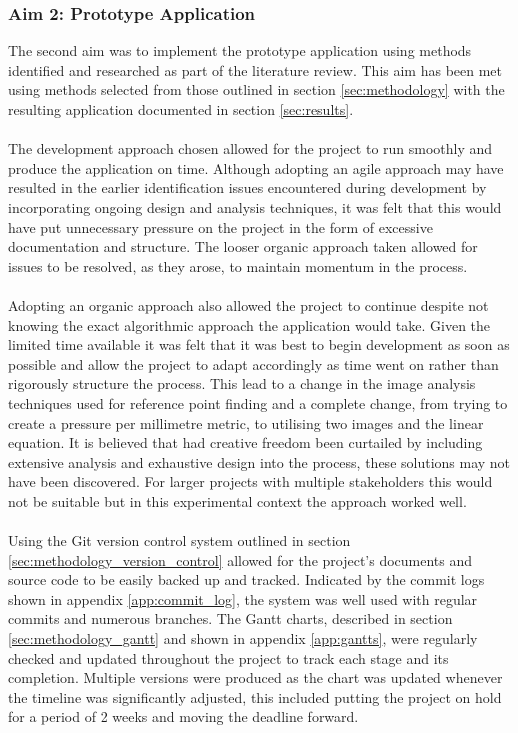 		\subsubsection{Aim 2: Prototype Application}
			The second aim was to implement the prototype application using methods identified and researched as part of the literature review. This aim has been met using methods selected from those outlined in section \ref{sec:methodology} with the resulting application documented in section \ref{sec:results}.
			\\\\
			The development approach chosen allowed for the project to run smoothly and produce the application on time. Although adopting an agile approach may have resulted in the earlier identification issues encountered during development by incorporating ongoing design and analysis techniques, it was felt that this would have put unnecessary pressure on the project in the form of excessive documentation and structure. The looser organic approach taken allowed for issues to be resolved, as they arose, to maintain momentum in the process. 
			\\\\
			Adopting an organic approach also allowed the project to continue despite not knowing the exact algorithmic approach the application would take. Given the limited time available it was felt that it was best to begin development as soon as possible and allow the project to adapt accordingly as time went on rather than rigorously structure the process. This lead to a change in the image analysis techniques used for reference point finding and a complete change, from trying to create a pressure per millimetre metric, to utilising two images and the linear equation. It is believed that had creative freedom been curtailed by including extensive analysis and exhaustive design into the process, these solutions may not have been discovered. For larger projects with multiple stakeholders this would not be suitable but in this experimental context the approach worked well.
			\\\\
			Using the Git version control system outlined in section \ref{sec:methodology_version_control} allowed for the project's documents and source code to be easily backed up and tracked. Indicated by the commit logs shown in appendix \ref{app:commit_log}, the system was well used with regular commits and numerous branches. The Gantt charts, described in section \ref{sec:methodology_gantt} and shown in appendix \ref{app:gantts}, were regularly checked and updated throughout the project to track each stage and its completion. Multiple versions were produced as the chart was updated whenever the timeline was significantly adjusted, this included putting the project on hold for a period of 2 weeks and moving the deadline forward.
